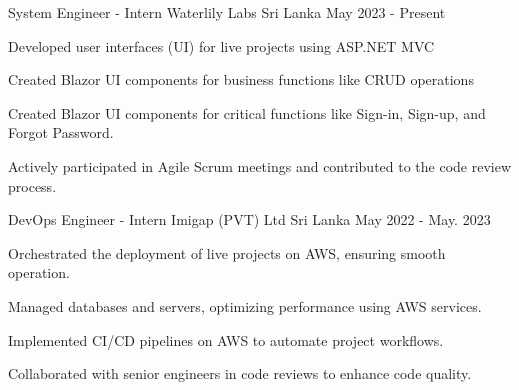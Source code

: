 

\begin{cventries}

  \cventry
  {System Engineer - Intern} %
  {Waterlily Labs} %
  {Sri Lanka} %
  {May 2023 - Present} %
  {
    \begin{cvitems} %
      \item {Developed user interfaces (UI) for live projects using ASP.NET MVC}
      \item {Created Blazor UI components for business functions like CRUD operations}
      \item {Created Blazor UI components for critical functions like Sign-in, Sign-up, and Forgot Password.}
      \item {Actively participated in Agile Scrum meetings and contributed to the code review process.}
    \end{cvitems}
  }

  \cventry
  {DevOps Engineer - Intern} %
  {Imigap (PVT) Ltd} %
  {Sri Lanka} %
  {May 2022 - May. 2023} %
  {
    \begin{cvitems} %
      \item {Orchestrated the deployment of live projects on AWS, ensuring smooth operation.}
      \item {Managed databases and servers, optimizing performance using AWS services.}
      \item {Implemented CI/CD pipelines on AWS to automate project workflows.}
      \item {Collaborated with senior engineers in code reviews to enhance code quality.}
    \end{cvitems}
  }


\end{cventries}
